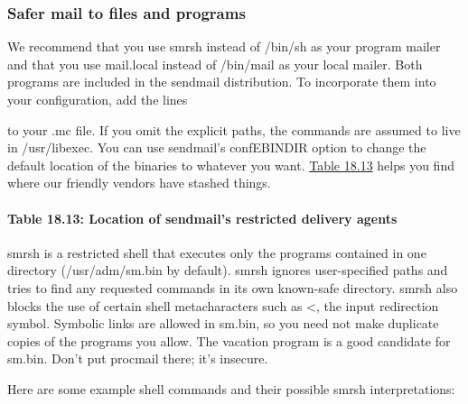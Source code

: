 \subsubsection[Safer mail to files and
programs]{\texorpdfstring{\protect\hypertarget{part0026_split_038.htmlux5cux23_idTextAnchor1106}{}{}Safer
mail to files and programs}{Safer mail to files and programs}}

We recommend that you use
\protect\hypertarget{part0026_split_038.htmlux5cux23_idIndexMarker2584}{}{}{smrsh}
instead of {/bin/sh} as your program mailer and that you use
{mail.local} instead of {/bin/mail} as your local mailer. Both programs
are included in the {sendmail} distribution. To incorporate them into
your configuration, add the lines


to your {.mc} file. If you omit the explicit paths, the commands are
assumed to live in {/usr/libexec}. You can use {sendmail}'s
{confEBINDIR} option to change the default location of the binaries to
whatever you want.
\protect\hyperlink{part0026_split_038.htmlux5cux23_idTextAnchor1107}{Table
18.13} helps you find where our friendly vendors have stashed things.

\paragraph[{Table 18.13: }Location of {sendmail}'s restricted delivery
agents]{\texorpdfstring{{Table 18.13:
}\protect\hypertarget{part0026_split_038.htmlux5cux23_idTextAnchor1107}{}{}\protect\hypertarget{part0026_split_038.htmlux5cux23_idTextAnchor1108}{}{}Location
of {sendmail}'s restricted delivery
agents}{Table 18.13: Location of sendmail's restricted delivery agents}}


{smrsh} is a restricted shell that executes only the programs contained
in one directory ({/usr/adm/sm.bin} by default). {smrsh} ignores
user-specified paths and tries to find any requested commands in its own
known-safe directory. {smrsh} also blocks the use of certain shell
metacharacters such as \textless, the input redirection symbol. Symbolic
links are allowed in {sm.bin}, so you need not make duplicate copies of
the programs you allow. The {vacation} program is a good candidate for
{sm.bin}. Don't put {procmail} there; it's insecure.

Here are some example shell commands and their possible {smrsh}
interpretations:

